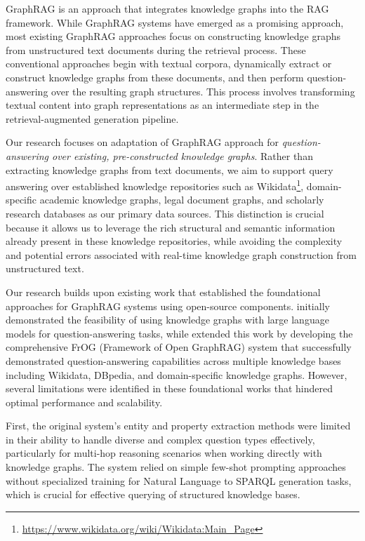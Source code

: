 GraphRAG \citep{edge2024localglobalgraphrag} is an approach that integrates knowledge graphs into the RAG framework. While GraphRAG systems have emerged as a promising approach, most existing GraphRAG approaches focus on constructing knowledge graphs from unstructured text documents during the retrieval process. These conventional approaches begin with textual corpora, dynamically extract or construct knowledge graphs from these documents, and then perform question-answering over the resulting graph structures. This process involves transforming textual content into graph representations as an intermediate step in the retrieval-augmented generation pipeline.

Our research focuses on adaptation of GraphRAG approach for \textit{question-answering over existing, pre-constructed knowledge graphs}. Rather than extracting knowledge graphs from text documents, we aim to support query answering over established knowledge repositories such as Wikidata\footnote{\url{https://www.wikidata.org/wiki/Wikidata:Main_Page}}, domain-specific academic knowledge graphs, legal document graphs, and scholarly research databases as our primary data sources. This distinction is crucial because it allows us to leverage the rich structural and semantic information already present in these knowledge repositories, while avoiding the complexity and potential errors associated with real-time knowledge graph construction from unstructured text.

Our research builds upon existing work that established the foundational approaches for GraphRAG systems using open-source components. \citet{ongris2024frog} initially demonstrated the feasibility of using knowledge graphs with large language models for question-answering tasks, while \citet{ongris2025frog} extended this work by developing the comprehensive FrOG (Framework of Open GraphRAG) system that successfully demonstrated question-answering capabilities across multiple knowledge bases including Wikidata, DBpedia, and domain-specific knowledge graphs. However, several limitations were identified in these foundational works that hindered optimal performance and scalability.

First, the original system's entity and property extraction methods were limited in their ability to handle diverse and complex question types effectively, particularly for multi-hop reasoning scenarios when working directly with knowledge graphs. The system relied on simple few-shot prompting approaches without specialized training for Natural Language to SPARQL generation tasks, which is crucial for effective querying of structured knowledge bases.

